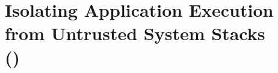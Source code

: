 
\chapter{Isolating Application Execution from Untrusted System Stacks\\ ({\em \sysname{}})}










